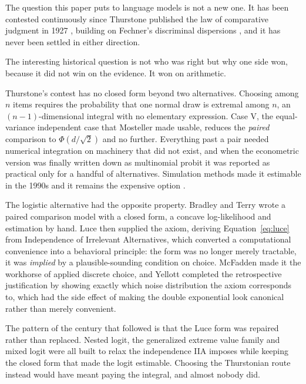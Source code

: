 \documentclass[11pt]{article}
\begin{document}
The question this paper puts to language models is not a new one. It has
been contested continuously since Thurstone published the law of comparative
judgment in 1927 \cite{thurstone1927}, building on Fechner's discriminal
dispersions \cite{fechner1860}, and it has never been settled in either
direction.

The interesting historical question is not who was right but why one side won,
because it did not win on the evidence. It won on arithmetic.

Thurstone's contest has no closed form beyond two alternatives. Choosing among
$n$ items requires the probability that one normal draw is extremal among $n$,
an $(n-1)$-dimensional integral with no elementary expression. Case V, the
equal-variance independent case that Mosteller \cite{mosteller1951} made
usable, reduces the \emph{paired} comparison to $\Phi(d/\sqrt{2})$ and no
further. Everything past a pair needed numerical integration on machinery that
did not exist, and when the econometric version was finally written down as
multinomial probit \cite{hausman1978} it was reported as practical only for a
handful of alternatives. Simulation methods made it estimable in the 1990s and
it remains the expensive option \cite{train2009}.

The logistic alternative had the opposite property. Bradley and Terry
\cite{bradley1952} wrote a paired comparison model with a closed form, a
concave log-likelihood and estimation by hand. Luce \cite{luce1959} then
supplied the axiom, deriving Equation~\eqref{eq:luce} from Independence of
Irrelevant Alternatives, which converted a computational convenience into a
behavioral principle: the form was no longer merely tractable, it was
\emph{implied} by a plausible-sounding condition on choice. McFadden
\cite{mcfadden1974} made it the workhorse of applied discrete choice, and
Yellott \cite{yellott1977} completed the retrospective justification by
showing exactly which noise distribution the axiom corresponds to, which had
the side effect of making the double exponential look canonical rather than
merely convenient.

The pattern of the century that followed is that the Luce form was repaired
rather than replaced. Nested logit, the generalized extreme value family and
mixed logit \cite{mcfaddentrain2000} were all built to relax the independence
IIA imposes while keeping the closed form that made the logit estimable.
Choosing the Thurstonian route instead would have meant paying the integral,
and almost nobody did.
\end{document}
